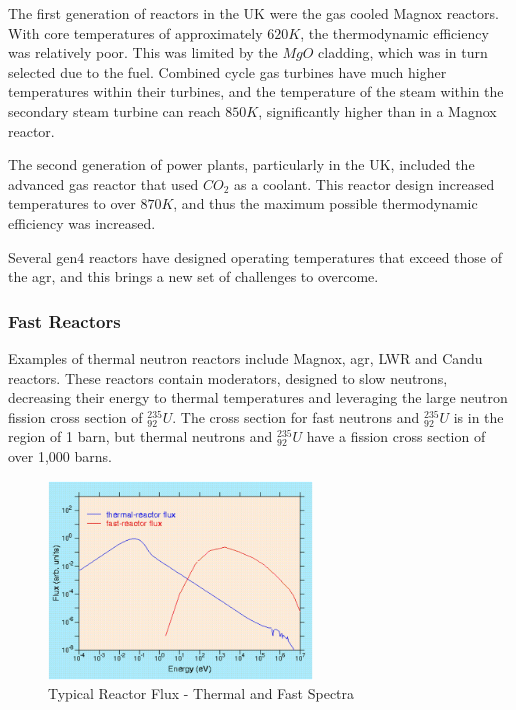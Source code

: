The first generation of reactors in the UK were the gas cooled Magnox reactors.  With core temperatures of approximately $620K$\cite{magnoxtemp}, the thermodynamic efficiency  was relatively poor.  This was limited by the $MgO$ cladding, which was in turn selected due to the fuel.  Combined cycle gas turbines have much higher temperatures within their turbines, and the temperature of the steam within the secondary steam turbine can reach $850K$\cite{ccppwiki}, significantly higher than in a Magnox reactor.

The second generation of power plants, particularly in the UK, included the advanced gas reactor that used $CO_2$ as a coolant.  This reactor design increased temperatures to over $870K$, and thus the maximum possible thermodynamic efficiency was increased.

Several \acrshort{gen4} reactors have designed operating temperatures that exceed those of the \acrshort{agr}, and this brings a new set of challenges to overcome.



\subsubsection{Fast Reactors}

Examples of thermal neutron reactors include Magnox, \acrshort{agr}, LWR and Candu reactors.  These reactors contain moderators, designed to slow neutrons, decreasing their energy to thermal temperatures and leveraging the large neutron fission cross section of ${}^{235}_{92}U$.  The cross section for fast neutrons and ${}^{235}_{92}U$ is in the region of 1 barn, but thermal neutrons and ${}^{235}_{92}U$ have a fission cross section of over 1,000 barns.

\begin{figure}[htbp]
  \begin{center}
    \includegraphics[width=7.0cm]{chapters/introduction/images/reactor-flux.png}
    \caption{Typical Reactor Flux - Thermal and Fast Spectra}
    \label{fig:flux1}
  \end{center}
\end{figure}

